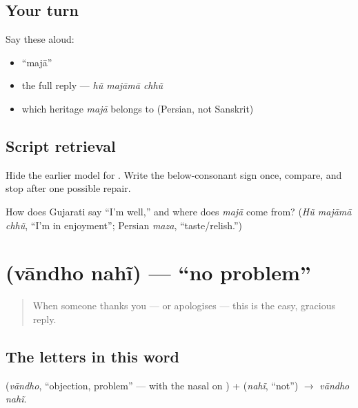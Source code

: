 \subsection*{Your turn}
Say these aloud:

\begin{itemize}
\raggedright
  \item \textquotedblleft{}majā\textquotedblright{}
  \item the full reply — \emph{hũ majāmā chhũ}
  \item which heritage \emph{majā} belongs to (Persian, not Sanskrit)
\end{itemize}

\subsection*{Script retrieval}
Hide the earlier model for \textbf{}. Write the below-consonant sign once, compare, and stop after one possible repair.

\begin{tcolorbox}[breakable,colback=teal!4,colframe=teal!35!black,title={Before you move on}]
How does Gujarati say \textquotedblleft{}I'm well,\textquotedblright{} and where does \emph{majā} come from? (\emph{Hũ majāmā chhũ}, \textquotedblleft{}I'm in enjoyment\textquotedblright{}; Persian \emph{maza}, \textquotedblleft{}taste/relish.\textquotedblright{})
\end{tcolorbox}
\section[\texorpdfstring{\gu{વાંધો} \gu{નહીં} (vāndho nahĩ)}{વાંધો નહીં (vāndho nahĩ)}]{  (vāndho nahĩ) — \textquotedblleft{}no problem\textquotedblright{}}

\label{lesson:GU-C03-vandho-nahi}



\begin{quote}
When someone thanks you — or apologises — this is the easy, gracious reply.
\end{quote}

\subsection*{The letters in this word}
\textbf{} (\emph{vāndho}, \textquotedblleft{}objection, problem\textquotedblright{} — with the nasal on \textbf{}) + \textbf{} (\emph{nahĩ}, \textquotedblleft{}not\textquotedblright{}) $\to$ \emph{vāndho nahĩ}.

